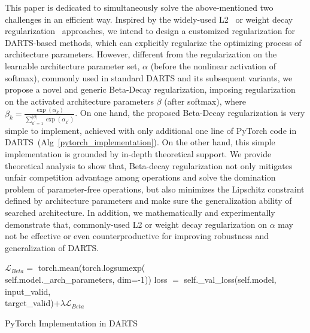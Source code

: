 \documentclass[10pt,twocolumn,letterpaper]{article}
\begin{document}
This paper is dedicated to simultaneously solve the above-mentioned two challenges in an efficient way. Inspired by the widely-used L2~\cite{cortes2012l2} or weight decay regularization~\cite{wd} approaches, we intend to design a customized regularization for DARTS-based methods, which can explicitly regularize the optimizing process of architecture parameters. However, different from the regularization on the learnable architecture parameter set, $\alpha$ (before the nonlinear activation of softmax), commonly used in standard DARTS and its subsequent variants, we propose a novel and generic Beta-Decay regularization, imposing regularization on the activated architecture parameters $\beta$ (after softmax), where $\beta_k=\frac{\exp \left(\alpha_{k}\right)}{\sum_{k^{\prime}=1}^{\left | \mathcal{O}\right |} \exp \left(\alpha_{k^{\prime}}\right)}$.
On one hand, the proposed Beta-Decay regularization is very simple to implement, achieved with only additional one line of PyTorch code in DARTS~(Alg~\ref{pytorch_implementation}). On the other hand, this simple implementation is grounded by in-depth theoretical support. We provide theoretical analysis to show that, Beta-decay regularization not only mitigates unfair competition advantage among operations and solve the domination problem of parameter-free operations, but also minimizes the Lipschitz constraint defined by architecture parameters and make sure the generalization ability of searched architecture. In addition, we mathematically and experimentally demonstrate that, commonly-used L2 or weight decay regularization on $\alpha$ may not be effective or even counterproductive for improving robustness and generalization of DARTS. 
\vspace{-6pt}
\begin{algorithm}[htb]
\label{alg:beta-decay code}   
\begin{algorithmic}[1] \STATE $\mathcal{L}_{Beta}=$  torch.mean(torch.logsumexp( \\
\qquad \quad self.model.\_arch\_parameters, dim=-1))
\STATE loss $=$ self.\_val\_loss(self.model, input\_valid, \\ 
\qquad \quad target\_valid)+$\lambda\mathcal{L}_{Beta} $
\end{algorithmic}  
\caption{PyTorch Implementation in DARTS}
\label{pytorch_implementation}
\end{algorithm} 
\vspace{-12pt}
\end{document}
